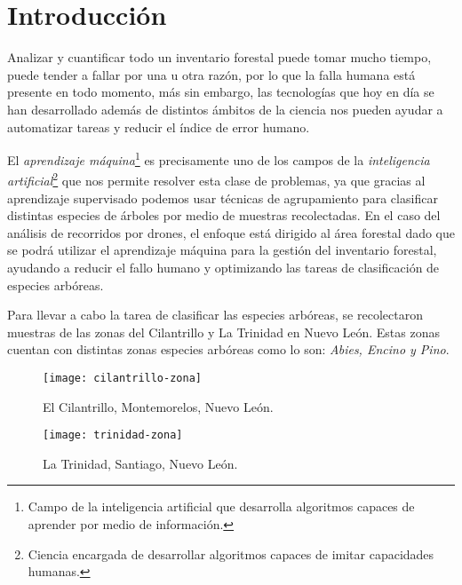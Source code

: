 \chapter{Introducción}
Analizar y cuantificar todo un inventario forestal puede tomar mucho tiempo, puede tender a fallar por una u otra razón, por lo que la falla humana está presente en todo momento, más sin embargo, las tecnologías que hoy en día se han desarrollado además de distintos ámbitos de la ciencia nos pueden ayudar a automatizar tareas y reducir el índice de error humano.

El \emph{aprendizaje máquina}\footnote{Campo de la inteligencia artificial que desarrolla algoritmos capaces de aprender por medio de información.} es precisamente uno de los campos de la \emph{inteligencia artificial}\footnote{Ciencia encargada de desarrollar algoritmos capaces de imitar capacidades humanas.} que nos permite resolver esta clase de problemas, ya que gracias al aprendizaje supervisado podemos usar técnicas de agrupamiento para clasificar distintas especies de árboles por medio de muestras recolectadas. En el caso del análisis de recorridos por drones, el enfoque está dirigido al área forestal dado que se podrá utilizar el aprendizaje máquina para la gestión del inventario forestal, ayudando a reducir el fallo humano y optimizando las tareas de clasificación de especies arbóreas.

Para llevar a cabo la tarea de clasificar las especies arbóreas, se recolectaron muestras de las zonas del Cilantrillo y La Trinidad en Nuevo León. Estas zonas cuentan con distintas zonas especies arbóreas como lo son: \emph{Abies, Encino y Pino}.
\newpage
\bigskip
\hspace{5 cm}
\begin{figure}[h!]
  \centering
  \begin{minipage}[b]{0.7\textwidth}
    \texttt{[image: cilantrillo-zona]}
    \caption{El Cilantrillo, Montemorelos, Nuevo León.}
  \end{minipage}
\end{figure}
\hspace{2 cm}
\begin{figure}[h!]
  \centering
  \begin{minipage}[b]{0.7\textwidth}
    \texttt{[image: trinidad-zona]}
    \caption{La Trinidad, Santiago, Nuevo León.}
  \end{minipage}
\end{figure}

\newpage

